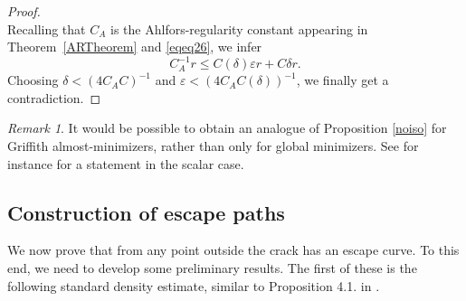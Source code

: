 \documentclass[12pt]{article}
\theoremstyle{definition}
\theoremstyle{remark}
\newtheorem{remark}[theorem]{Remark}
\numberwithin{equation}{section}
\newcommand{\warning}[1]{\sethlcolor{warningcolor}\hl{#1}\sethlcolor{yellow}}
\begin{document}
\begin{proof}
\begin{equation}
    \end{equation}
    Recalling that $C_A$ is the Ahlfors-regularity constant appearing in Theorem~\ref{ARTheorem} and \eqref{eqeq26}, we infer
    \begin{equation}
        C_A^{-1} r \leq C(\delta) \varepsilon r + C \delta r.
    \end{equation}
    Choosing $\delta<(4C_A C)^{-1}$ and $\varepsilon<(4C_A C(\delta))^{-1}$, we finally get a contradiction.
\end{proof}


\begin{remark} 
    It would be possible to obtain an analogue of Proposition \ref{noiso} for Griffith almost-minimizers,
    rather than only for global minimizers. See for instance \cite[Proposition 68.1]{d} for a statement in the scalar case.
\end{remark}


\subsection{Construction of escape paths}

We now prove that from any point outside the crack has an escape curve. To this end, we need to develop some preliminary
results. The first of these is the following standard density estimate, similar to Proposition 4.1. in
\cite{BabadjianIurlanoLemenant}.
\end{document}
